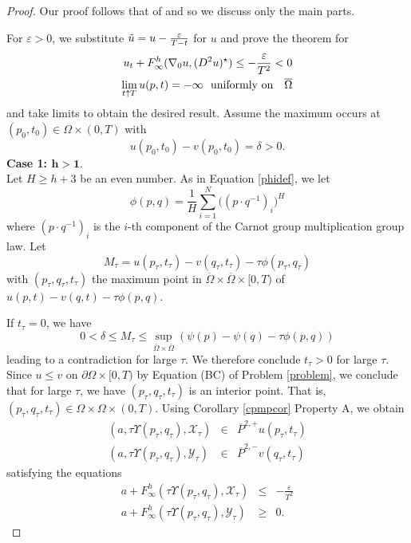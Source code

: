 \documentclass[12pt]{amsart}
\theoremstyle{definition}
\theoremstyle{remark}
\numberwithin{equation}{section}
\begin{document}
\begin{proof}
Our proof follows that of \cite[Thm. 8.2]{CIL:UGTVS} and so we discuss only the main parts. 

For $\varepsilon > 0$, we substitute $\tilde{u}=u-\frac{{\displaystyle}\varepsilon}{T-t}$ for $u$ and prove the theorem for 
\begin{eqnarray}
u_t+F^h_\infty(\nabla_0 u,(D^2u)^\star) \leq -\frac{\varepsilon}{T^2} < 0 \\ 
\lim_{t \uparrow T}u(p,t) = -\infty \ \  \textmd{uniformly on }\ \ \overline{\Omega}
\end{eqnarray}
and take limits to obtain the desired result.
Assume the maximum occurs at $(p_0,t_0)\in \Omega \times (0,T)$ with $$u(p_0,t_0)-v(p_0,t_0)= \delta >0.$$
\textbf{Case 1: $\boldsymbol{h>1.}$} \\
Let $H\geq h+3$ be an even number. As in Equation \eqref{phidef}, we let $$\phi(p, q) = \frac{1}{H}\sum_{i=1}^{N}\big((p\cdot q^{-1})_i \big)^H$$
where $(p\cdot q^{-1})_i$ is the $i$-th component of the Carnot group multiplication group law. Let 
$$M_\tau=u(p_\tau,t_\tau)-v(q_\tau,t_\tau)-\tau\phi(p_\tau,q_\tau)$$ with $(p_\tau,q_\tau,t_\tau)$ the maximum point in $\overline{\Omega} \times \overline{\Omega} \times [0,T)$ of 
$u(p,t)-v(q,t)-\tau \phi(p,q)$. 

If $t_\tau=0$, we have 
$$0 < \delta \leq M_\tau \leq \sup_{\overline{\Omega}\times\overline{\Omega}}(\psi(p)-\psi(q)-\tau \phi(p,q))$$ leading to a contradiction for large $\tau$.  We therefore conclude $t_\tau >0$ for large $\tau$.  Since $u \leq v$ on $\partial \Omega \times [0,T)$ by Equation (BC) of Problem \eqref{problem}, we conclude that for large $\tau$, we have $(p_\tau,q_\tau,t_\tau)$ is an interior point. That is, 
$(p_\tau,q_\tau,t_\tau) \in \Omega \times \Omega \times (0,T)$.
Using  Corollary \ref{cpmpcor} Property A,  we obtain
\begin{eqnarray*}
(a,\tau \Upsilon(p_\tau,q_\tau), \mathcal{X}_\tau) & \in & \overline{P}^{2,+}u(p_\tau,t_\tau) \\
(a,\tau \Upsilon(p_\tau,q_\tau), \mathcal{Y}_\tau) & \in & \overline{P}^{2,-}v(q_\tau,t_\tau)
\end{eqnarray*}  
satisfying the equations 
\begin{eqnarray*}
a+F^h_\infty(\tau\Upsilon(p_\tau,q_\tau), \mathcal{X}_\tau) & \leq & -\frac{\varepsilon}{T^2} \\
a+F^h_\infty(\tau\Upsilon(p_\tau,q_\tau), \mathcal{Y}_\tau) & \geq & 0.
\end{eqnarray*}


\end{proof}
\end{document}
